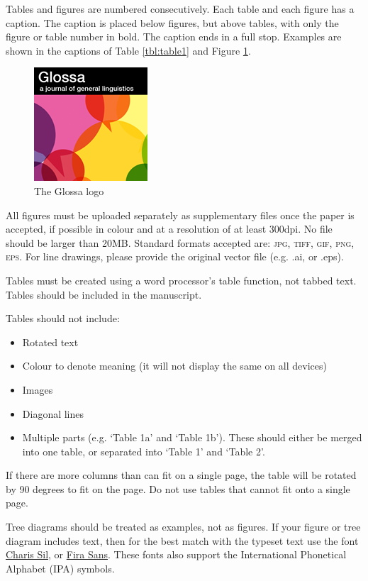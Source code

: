 \documentclass[charis,linguex,biblatex]{glossa}
\begin{document}
Tables and figures are numbered consecutively. Each table and each figure has a caption. The caption is placed below figures, but above tables, with only the figure or table number in bold. The caption ends in a full stop. Examples are shown in the captions of Table \ref{tbl:table1} and Figure \ref{fig:glossalogo}. 

\begin{figure}[h]
\centering
\includegraphics{glossa}
\caption{The Glossa logo}
\label{fig:glossalogo}
\end{figure}

All figures must be uploaded separately as supplementary files once the paper is accepted, if possible in colour and at a resolution of at least 300dpi. No file should be larger than 20MB. Standard formats accepted are: \textsc{jpg, tiff, gif, png, eps}. For line drawings, please provide the original vector file (e.g. .ai, or .eps).

Tables must be created using a word processor's table function, not tabbed text. Tables should be included in the manuscript. 

Tables should not include:

\begin{itemize}
\item Rotated text
\item Colour to denote meaning (it will not display the same on all devices)
\item Images
\item Diagonal lines
\item Multiple parts (e.g. `Table 1a' and `Table 1b'). These should either be merged into one table, or separated into `Table 1' and `Table 2'.
\end{itemize}
If there are more columns than can fit on a single page, the table will be rotated by 90 degrees to fit on the page. Do not use tables that cannot fit onto a single page.

Tree diagrams should be treated as examples, not as figures. If your figure or tree diagram includes text, then for the best match with the typeset text use the font \href{https://software.sil.org/charis/download/}{Charis Sil}, or \href{https://www.fontsquirrel.com/fonts/fira-sans}{Fira Sans}. These fonts also support the International Phonetical Alphabet (IPA) symbols.
\end{document}

